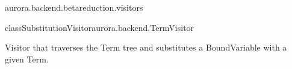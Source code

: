 \begin{texdocpackage}{aurora.backend.betareduction.visitors}
\begin{texdocclass}{class}{SubstitutionVisitor}{aurora.backend.TermVisitor}{}
\label{texdoclet:aurora.backend.betareduction.visitors.SubstitutionVisitor}
\begin{texdocclassintro}
Visitor that traverses the Term tree and substitutes a BoundVariable with a given Term.\end{texdocclassintro}
\begin{texdocclassconstructors}
\end{texdocclassconstructors}
\begin{texdocclassmethods}
\end{texdocclassmethods}
\end{texdocclass}


\end{texdocpackage}



